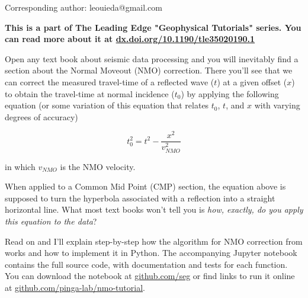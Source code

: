 Corresponding author: leouieda@gmail.com

\textbf{This is a part of The Leading Edge "Geophysical Tutorials" series.
You can read more about it at \href{https://dx.doi.org/10.1190/tle35020190.1}{dx.doi.org/10.1190/tle35020190.1}}

Open any text book about seismic data processing and you will inevitably find a
section about the Normal Moveout (NMO) correction.
There you'll see that we can correct the measured travel-time of a reflected
wave ($t$) at a given offset ($x$) to obtain the travel-time at normal
incidence ($t_0$) by applying the following equation 
(or some variation of this equation that relates $t_0$, $t$, and $x$ with varying degrees of accuracy)

\begin{equation}
t_0^2=t^2-\dfrac{x^2}{v_{NMO}^2}
\label{eq:traveltime}
\end{equation}

in which $v_{NMO}$ is the NMO velocity.

When applied to a Common Mid Point (CMP) section, the equation above is
supposed to turn the hyperbola associated with a reflection into a straight
horizontal line.
What most text books won't tell you is \textit{how, exactly, do you apply this
equation to the data}?

Read on and I'll explain step-by-step how the algorithm for NMO correction from
\citet{Yilmaz_2001} works and how to implement it in Python.
The accompanying Jupyter notebook \citep{Perez_2007} contains the full source
code, with documentation and tests for each function.
You can download the notebook at
\href{https://github.com/seg}{github.com/seg} or
find links to run it online at
\href{https://github.com/pinga-lab/nmo-tutorial}{github.com/pinga-lab/nmo-tutorial}.
